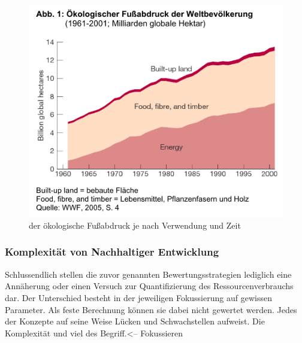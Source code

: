\documentclass{scrartcl}
\begin{document}
\begin{figure}[htbp]
\centering
\includegraphics[width=12cm]{image_folder/oekFussabdruckZeit.png}
\caption{der ökologische Fußabdruck je nach Verwendung und Zeit}
\label{fig: oekFussabdruckZeit}
\end{figure}

\subsubsection{Komplexität von Nachhaltiger Entwicklung}

Schlussendlich stellen die zuvor genannten Bewertungsstrategien lediglich eine Annäherung oder einen Versuch zur Quantifizierung des Ressourcenverbrauchs dar. Der Unterschied besteht in der jeweiligen Fokussierung auf gewissen Parameter.  Als feste Berechnung können sie dabei nicht gewertet werden. Jedes der Konzepte auf seine Weise Lücken und Schwachstellen aufweist. Die Komplexität und viel des Begriff.<-- Fokussieren
\end{document}
